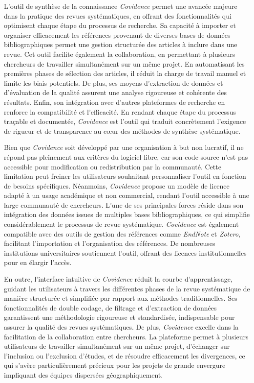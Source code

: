 \documentclass[
  letterpaper,
  DIV=11,
  numbers=noendperiod,
  oneside]{scrreprt}
\begin{document}
L'outil de synthèse de la connaissance \emph{Covidence} permet une
avancée majeure dans la pratique des revues systématiques, en offrant
des fonctionnalités qui optimisent chaque étape du processus de
recherche. Sa capacité à importer et organiser efficacement les
références provenant de diverses bases de données bibliographiques
permet une gestion structurée des articles à inclure dans une revue. Cet
outil facilite également la collaboration, en permettant à plusieurs
chercheurs de travailler simultanément sur un même projet. En
automatisant les premières phases de sélection des articles, il réduit
la charge de travail manuel et limite les biais potentiels. De plus, ses
moyens d'extraction de données et d'évaluation de la qualité assurent
une analyse rigoureuse et cohérente des résultats. Enfin, son
intégration avec d'autres plateformes de recherche en renforce la
compatibilité et l'efficacité. En rendant chaque étape du processus
traçable et documentée, \emph{Covidence} est l'outil qui traduit
concrètement l'exigence de rigueur et de transparence au cœur des
méthodes de synthèse systématique.

Bien que \emph{Covidence} soit développé par une organisation à but non
lucratif, il ne répond pas pleinement aux critères du logiciel libre,
car son code source n'est pas accessible pour modification ou
redistribution par la communauté. Cette limitation peut freiner les
utilisateurs souhaitant personnaliser l'outil en fonction de besoins
spécifiques. Néanmoins, \emph{Covidence} propose un modèle de licence
adapté à un usage académique et non commercial, rendant l'outil
accessible à une large communauté de chercheurs. L'une de ses
principales forces réside dans son intégration des données issues de
multiples bases bibliographiques, ce qui simplifie considérablement le
processus de revue systématique. \emph{Covidence} est également
compatible avec des outils de gestion des références comme
\emph{EndNote} et \emph{Zotero}, facilitant l'importation et
l'organisation des références. De nombreuses institutions universitaires
soutiennent l'outil, offrant des licences institutionnelles pour en
élargir l'accès.

En outre, l'interface intuitive de \emph{Covidence} réduit la courbe
d'apprentissage, guidant les utilisateurs à travers les différentes
phases de la revue systématique de manière structurée et simplifiée par
rapport aux méthodes traditionnelles. Ses fonctionnalités de double
codage, de filtrage et d'extraction de données garantissent une
méthodologie rigoureuse et standardisée, indispensable pour assurer la
qualité des revues systématiques. De plus, \emph{Covidence} excelle dans
la facilitation de la collaboration entre chercheurs. La plateforme
permet à plusieurs utilisateurs de travailler simultanément sur un même
projet, d'échanger sur l'inclusion ou l'exclusion d'études, et de
résoudre efficacement les divergences, ce qui s'avère particulièrement
précieux pour les projets de grande envergure impliquant des équipes
dispersées géographiquement.
\end{document}
